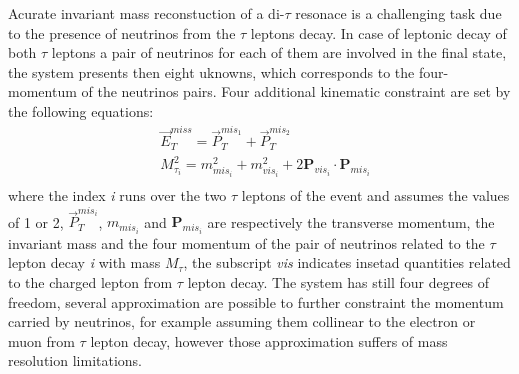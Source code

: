 Acurate invariant mass reconstuction of a di-$\tau$ resonace is a challenging task
due to the presence of neutrinos from the $\tau$ leptons decay. 
In case of leptonic decay of both $\tau$ leptons a pair of neutrinos for each
of them are involved in the final state,  the system presents then eight uknowns, which corresponds to the four-momentum of the neutrinos pairs.
Four additional kinematic constraint are set by the following equations:
\begin{equation} \label{eq:MMC}
\begin{split}
&\vec{E}_T^{miss} = \vec{P}_{T}^{mis_{1}} +  \vec{P}_{T}^{mis_2} \\
&M_{\tau_{i}}^2 = m^2_{mis_{i}} + m^2_{vis_{i}} + 2 \mathbf{P}_{vis_i} \cdot \mathbf{P}_{mis_i} \\
\end{split}
\end{equation}
where the index \emph{i} runs over the two $\tau$ leptons of the event and assumes the values of 1 or 2, 
$\vec{P}_{T}^{mis_{i}}$, $m_{mis_{i}}$ and $\mathbf{P}_{mis_{i}}$ are respectively the transverse momentum, the invariant mass and 
the four momentum of the pair of neutrinos related to the  $\tau$ lepton decay \emph{i} with mass $M_{\tau}$, the subscript \emph{vis} indicates insetad 
quantities related to the charged lepton from  $\tau$ lepton decay. The system has still four degrees of freedom,
several approximation are possible to further constraint the momentum carried by neutrinos,
for example assuming them collinear to the electron or muon from $\tau$ lepton decay, however those approximation 
suffers of mass resolution limitations.


